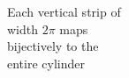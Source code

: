 \documentclass[preview]{standalone}
\begin{document}
\begin{center}
Each vertical strip of \\width $2\pi$ maps\\bijectively to the\\entire cylinder
\end{center}
\end{document}
